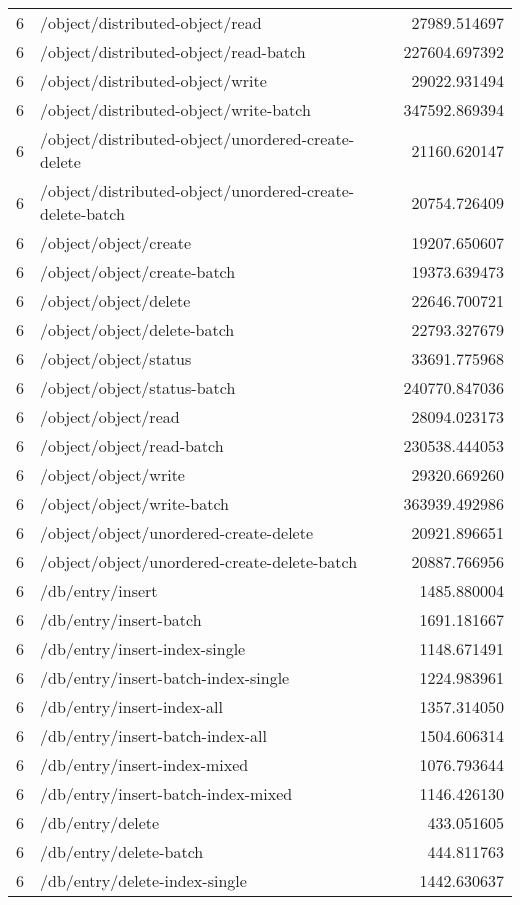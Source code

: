 \begin{longtable}{rlr}
6 & /object/distributed-object/read & 27989.514697 \\
6 & /object/distributed-object/read-batch & 227604.697392 \\
6 & /object/distributed-object/write & 29022.931494 \\
6 & /object/distributed-object/write-batch & 347592.869394 \\
6 & /object/distributed-object/unordered-create-delete & 21160.620147 \\
6 & /object/distributed-object/unordered-create-delete-batch & 20754.726409 \\
6 & /object/object/create & 19207.650607 \\
6 & /object/object/create-batch & 19373.639473 \\
6 & /object/object/delete & 22646.700721 \\
6 & /object/object/delete-batch & 22793.327679 \\
6 & /object/object/status & 33691.775968 \\
6 & /object/object/status-batch & 240770.847036 \\
6 & /object/object/read & 28094.023173 \\
6 & /object/object/read-batch & 230538.444053 \\
6 & /object/object/write & 29320.669260 \\
6 & /object/object/write-batch & 363939.492986 \\
6 & /object/object/unordered-create-delete & 20921.896651 \\
6 & /object/object/unordered-create-delete-batch & 20887.766956 \\
6 & /db/entry/insert & 1485.880004 \\
6 & /db/entry/insert-batch & 1691.181667 \\
6 & /db/entry/insert-index-single & 1148.671491 \\
6 & /db/entry/insert-batch-index-single & 1224.983961 \\
6 & /db/entry/insert-index-all & 1357.314050 \\
6 & /db/entry/insert-batch-index-all & 1504.606314 \\
6 & /db/entry/insert-index-mixed & 1076.793644 \\
6 & /db/entry/insert-batch-index-mixed & 1146.426130 \\
6 & /db/entry/delete & 433.051605 \\
6 & /db/entry/delete-batch & 444.811763 \\
6 & /db/entry/delete-index-single & 1442.630637 \\

\end{longtable}
